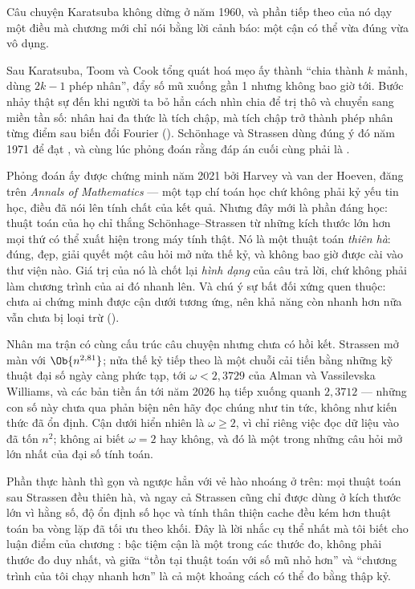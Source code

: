 \documentclass[../../algorithm.tex]{subfiles}
\begin{document}
Câu chuyện Karatsuba không dừng ở năm 1960, và phần tiếp theo của nó dạy một điều mà chương  mới chỉ nói bằng lời cảnh báo: một cận có thể vừa đúng vừa vô dụng.

Sau Karatsuba, Toom và Cook tổng quát hoá mẹo ấy thành ``chia thành \(k\) mảnh, dùng \(2k-1\) phép nhân'', đẩy số mũ xuống gần 1 nhưng không bao giờ tới. Bước nhảy thật sự đến khi người ta bỏ hẳn cách nhìn chia để trị thô và chuyển sang miền tần số: nhân hai đa thức là tích chập, mà tích chập trở thành phép nhân từng điểm sau biến đổi Fourier (). Schönhage và Strassen dùng đúng ý đó năm 1971 để đạt , và cùng lúc phỏng đoán rằng đáp án cuối cùng phải là .

Phỏng đoán ấy được chứng minh năm 2021 bởi Harvey và van der Hoeven\cite{harvey2021}, đăng trên \emph{Annals of Mathematics} --- một tạp chí toán học chứ không phải kỷ yếu tin học, điều đã nói lên tính chất của kết quả. Nhưng đây mới là phần đáng học: thuật toán của họ chỉ thắng Schönhage--Strassen từ những kích thước lớn hơn mọi thứ có thể xuất hiện trong máy tính thật. Nó là một thuật toán \emph{thiên hà}: đúng, đẹp, giải quyết một câu hỏi mở nửa thế kỷ, và không bao giờ được cài vào thư viện nào. Giá trị của nó là chốt lại \emph{hình dạng} của câu trả lời, chứ không phải làm chương trình của ai đó nhanh lên. Và chú ý sự bất đối xứng quen thuộc: chưa ai chứng minh được cận dưới  tương ứng, nên khả năng còn nhanh hơn nữa vẫn chưa bị loại trừ ().

Nhân ma trận có cùng cấu trúc câu chuyện nhưng chưa có hồi kết. Strassen\cite{strassen1969} mở màn với \(\Ob{n^{2,81}}\); nửa thế kỷ tiếp theo là một chuỗi cải tiến bằng những kỹ thuật đại số ngày càng phức tạp, tới \(\omega < 2{,}3729\) của Alman và Vassilevska Williams\cite{alman2021}, và các bản tiền ấn tới năm 2026 hạ tiếp xuống quanh \(2{,}3712\)\cite{alman2026} --- những con số này chưa qua phản biện nên hãy đọc chúng như tin tức, không như kiến thức đã ổn định. Cận dưới hiển nhiên là \(\omega \ge 2\), vì chỉ riêng việc đọc dữ liệu vào đã tốn \(n^2\); không ai biết \(\omega = 2\) hay không, và đó là một trong những câu hỏi mở lớn nhất của đại số tính toán.

Phần thực hành thì gọn và ngược hẳn với vẻ hào nhoáng ở trên: mọi thuật toán sau Strassen đều thiên hà, và ngay cả Strassen cũng chỉ được dùng ở kích thước lớn vì hằng số, độ ổn định số học và tính thân thiện cache đều kém hơn thuật toán ba vòng lặp đã tối ưu theo khối. Đây là lời nhắc cụ thể nhất mà tôi biết cho luận điểm của chương : bậc tiệm cận là một trong các thước đo, không phải thước đo duy nhất, và giữa ``tồn tại thuật toán với số mũ nhỏ hơn'' và ``chương trình của tôi chạy nhanh hơn'' là cả một khoảng cách có thể đo bằng thập kỷ.
\end{document}

